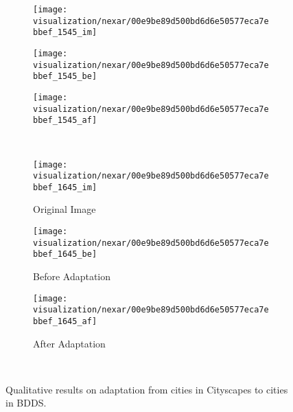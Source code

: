 \documentclass[10pt,twocolumn,letterpaper]{article}
\begin{document}
\begin{figure*}[t!]
\centering
	\begin{subfigure}[t]{0.33\linewidth}
		\centering
		\texttt{[image: visualization/nexar/00e9be89d500bd6d6e50577eca7ebbef\_1545\_im]}
	\end{subfigure}
	\hfill
	\begin{subfigure}[t]{0.33\linewidth}
		\centering
		\texttt{[image: visualization/nexar/00e9be89d500bd6d6e50577eca7ebbef\_1545\_be]}
	\end{subfigure}
	\hfill
	\begin{subfigure}[t]{0.33\linewidth}
		\centering
		\texttt{[image: visualization/nexar/00e9be89d500bd6d6e50577eca7ebbef\_1545\_af]}
	\end{subfigure}
	\hfill
	\\
	\centering
	\begin{subfigure}[t]{0.33\linewidth}
		\centering
		\texttt{[image: visualization/nexar/00e9be89d500bd6d6e50577eca7ebbef\_1645\_im]}
        \caption{Original Image}
	\end{subfigure}
	\hfill
	\begin{subfigure}[t]{0.33\linewidth}
		\centering
		\texttt{[image: visualization/nexar/00e9be89d500bd6d6e50577eca7ebbef\_1645\_be]}
        \caption{Before Adaptation}
	\end{subfigure}
	\hfill
	\begin{subfigure}[t]{0.33\linewidth}
		\centering
		\texttt{[image: visualization/nexar/00e9be89d500bd6d6e50577eca7ebbef\_1645\_af]}
        \caption{After Adaptation}
	\end{subfigure}
	\hfill
	\\
\caption{Qualitative results on adaptation from cities in Cityscapes to cities in BDDS.}
	\label{fig:city2nexar}
\end{figure*}



%
 
\end{document}
